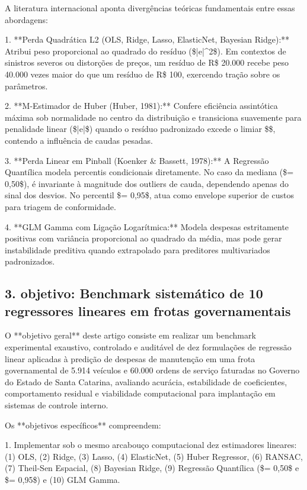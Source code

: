 \documentclass[12pt,a4paper]{article}
\begin{document}
A literatura internacional aponta divergências teóricas fundamentais entre essas abordagens:

1. **Perda Quadrática L2 (OLS, Ridge, Lasso, ElasticNet, Bayesian Ridge):** Atribui peso proporcional ao quadrado do resíduo (\$|e|^2\$). Em contextos de sinistros severos ou distorções de preços, um resíduo de R\$ 20.000 recebe peso 40.000 vezes maior do que um resíduo de R\$ 100, exercendo tração sobre os parâmetros.

2. **M-Estimador de Huber (Huber, 1981):** Confere eficiência assintótica máxima sob normalidade no centro da distribuição e transiciona suavemente para penalidade linear (\$|e|\$) quando o resíduo padronizado excede o limiar \$\epsilon\$, contendo a influência de caudas pesadas.

3. **Perda Linear em Pinball (Koenker \& Bassett, 1978):** A Regressão Quantílica modela percentis condicionais diretamente. No caso da mediana (\$\tau = 0,50\$), é invariante à magnitude dos outliers de cauda, dependendo apenas do sinal dos desvios. No percentil \$\tau = 0,95\$, atua como envelope superior de custos para triagem de conformidade.

4. **GLM Gamma com Ligação Logarítmica:** Modela despesas estritamente positivas com variância proporcional ao quadrado da média, mas pode gerar instabilidade preditiva quando extrapolado para preditores multivariados padronizados.


\subsection{3. objetivo: Benchmark sistemático de 10 regressores lineares em frotas governamentais}

O **objetivo geral** deste artigo consiste em realizar um benchmark experimental exaustivo, controlado e auditável de dez formulações de regressão linear aplicadas à predição de despesas de manutenção em uma frota governamental de 5.914 veículos e 60.000 ordens de serviço faturadas no Governo do Estado de Santa Catarina, avaliando acurácia, estabilidade de coeficientes, comportamento residual e viabilidade computacional para implantação em sistemas de controle interno.

Os **objetivos específicos** compreendem:

1. Implementar sob o mesmo arcabouço computacional dez estimadores lineares: (1) OLS, (2) Ridge, (3) Lasso, (4) ElasticNet, (5) Huber Regressor, (6) RANSAC, (7) Theil-Sen Espacial, (8) Bayesian Ridge, (9) Regressão Quantílica (\$\tau = 0,50\$ e \$\tau = 0,95\$) e (10) GLM Gamma.
\end{document}
